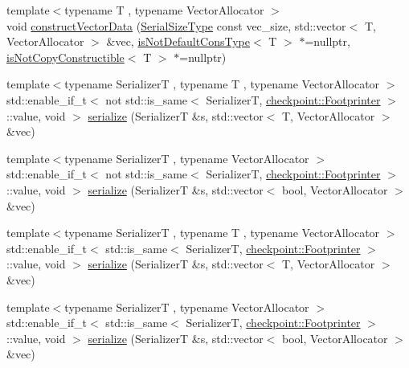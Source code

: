 \begin{DoxyCompactItemize}
\item 
{\footnotesize template$<$typename T , typename Vector\+Allocator $>$ }\\void \hyperlink{namespacecheckpoint_ab21ae06103ddad9d211e21ea8c79b69f}{construct\+Vector\+Data} (\hyperlink{namespacecheckpoint_a083f6674da3f94c2901b18c6d238217c}{Serial\+Size\+Type} const vec\+\_\+size, std\+::vector$<$ T, Vector\+Allocator $>$ \&vec, \hyperlink{namespacecheckpoint_a4032c86e7c92702198dd675a2696ee2c}{is\+Not\+Default\+Cons\+Type}$<$ T $>$ $\ast$=nullptr, \hyperlink{namespacecheckpoint_a141a100f9dcca06fb0b6dbf44a5d6756}{is\+Not\+Copy\+Constructible}$<$ T $>$ $\ast$=nullptr)
\item 
{\footnotesize template$<$typename SerializerT , typename T , typename Vector\+Allocator $>$ }\\std\+::enable\+\_\+if\+\_\+t$<$ not std\+::is\+\_\+same$<$ SerializerT, \hyperlink{structcheckpoint_1_1_footprinter}{checkpoint\+::\+Footprinter} $>$\+::value, void $>$ \hyperlink{namespacecheckpoint_ae9a809c203a65d06dbd99acc82be4844}{serialize} (SerializerT \&s, std\+::vector$<$ T, Vector\+Allocator $>$ \&vec)
\item 
{\footnotesize template$<$typename SerializerT , typename Vector\+Allocator $>$ }\\std\+::enable\+\_\+if\+\_\+t$<$ not std\+::is\+\_\+same$<$ SerializerT, \hyperlink{structcheckpoint_1_1_footprinter}{checkpoint\+::\+Footprinter} $>$\+::value, void $>$ \hyperlink{namespacecheckpoint_a4dbdef848c92782b54888f6247f8e8ba}{serialize} (SerializerT \&s, std\+::vector$<$ bool, Vector\+Allocator $>$ \&vec)
\item 
{\footnotesize template$<$typename SerializerT , typename T , typename Vector\+Allocator $>$ }\\std\+::enable\+\_\+if\+\_\+t$<$ std\+::is\+\_\+same$<$ SerializerT, \hyperlink{structcheckpoint_1_1_footprinter}{checkpoint\+::\+Footprinter} $>$\+::value, void $>$ \hyperlink{namespacecheckpoint_a3f43839a02cd77538b0d2f4192e926be}{serialize} (SerializerT \&s, std\+::vector$<$ T, Vector\+Allocator $>$ \&vec)
\item 
{\footnotesize template$<$typename SerializerT , typename Vector\+Allocator $>$ }\\std\+::enable\+\_\+if\+\_\+t$<$ std\+::is\+\_\+same$<$ SerializerT, \hyperlink{structcheckpoint_1_1_footprinter}{checkpoint\+::\+Footprinter} $>$\+::value, void $>$ \hyperlink{namespacecheckpoint_af95ab4d3ad37bb33b284e3a51047d685}{serialize} (SerializerT \&s, std\+::vector$<$ bool, Vector\+Allocator $>$ \&vec)

\end{DoxyCompactItemize}
